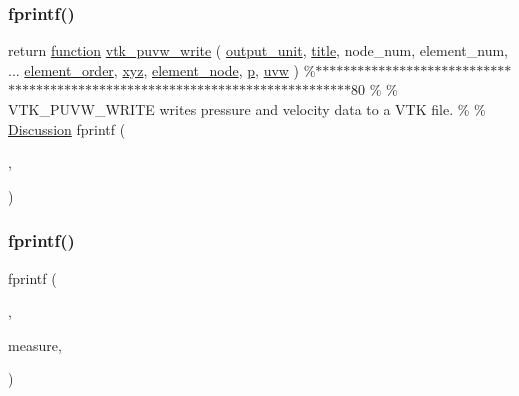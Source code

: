 \subsubsection{\texorpdfstring{fprintf()}{fprintf()}\hspace{0.1cm}{\footnotesize\ttfamily [4/19]}}
{\footnotesize\ttfamily return \hyperlink{a00611_a2420833d971716e9bab41cc9fb3abba1}{function} \hyperlink{a00611_a820b061ee96c178a7c94b48c0189d2ef}{vtk\+\_\+puvw\+\_\+write} ( \hyperlink{a00614_a21b113ecd24e6ae8a92fa4a149ad8701}{output\+\_\+unit}, \hyperlink{a00617_a051e403214cb6872ad3fe4e50302a6ee}{title}, node\+\_\+num, element\+\_\+num, ... \hyperlink{a00611_aa77ee84ffb15118601acbd018f243edc}{element\+\_\+order}, \hyperlink{a00614_a6444a221e6b74abaf6d67d44af2650a0}{xyz}, \hyperlink{a00614_a50df015479692caa32ea5ed86939881e}{element\+\_\+node}, \hyperlink{a00614_a1e0420801cd5156c14e085b87a4945f5}{p}, \hyperlink{a00614_ac062c50cc1b43901b7ea410ae1ff3be9}{uvw} ) \%$\ast$$\ast$$\ast$$\ast$$\ast$$\ast$$\ast$$\ast$$\ast$$\ast$$\ast$$\ast$$\ast$$\ast$$\ast$$\ast$$\ast$$\ast$$\ast$$\ast$$\ast$$\ast$$\ast$$\ast$$\ast$$\ast$$\ast$$\ast$$\ast$$\ast$$\ast$$\ast$$\ast$$\ast$$\ast$$\ast$$\ast$$\ast$$\ast$$\ast$$\ast$$\ast$$\ast$$\ast$$\ast$$\ast$$\ast$$\ast$$\ast$$\ast$$\ast$$\ast$$\ast$$\ast$$\ast$$\ast$$\ast$$\ast$$\ast$$\ast$$\ast$$\ast$$\ast$$\ast$$\ast$$\ast$$\ast$$\ast$$\ast$$\ast$$\ast$$\ast$$\ast$$\ast$$\ast$$\ast$$\ast$80 \% \% V\+T\+K\+\_\+\+P\+U\+V\+W\+\_\+\+W\+R\+I\+TE writes pressure and velocity data to a V\+TK file. \% \% \hyperlink{a00611_afb022d1087d237270af4fbdcc4cce30e}{Discussion} fprintf (\begin{DoxyParamCaption}\item[{1}]{,  }\item[{\textquotesingle{}V\+T\+K\+\_\+\+P\+U\+V\+W\+\_\+\+W\+R\+I\+TE -\/ \hyperlink{a00623_a781a04ab095280f838ff3eb0e51312e0}{Note\+:\textbackslash{}n}\textquotesingle{}}]{ }\end{DoxyParamCaption})}

\mbox{\label{a00611_afdbca82e8254187eadd7c66d61051c3c}} 
\subsubsection{\texorpdfstring{fprintf()}{fprintf()}\hspace{0.1cm}{\footnotesize\ttfamily [5/19]}}
{\footnotesize\ttfamily fprintf (\begin{DoxyParamCaption}\item[{1}]{,  }\item[{\textquotesingle{} As a temporary}]{measure,  }\item[{we are handling quadratic \hyperlink{a00623_a781a04ab095280f838ff3eb0e51312e0}{tets\textbackslash{}n}\textquotesingle{}}]{ }\end{DoxyParamCaption})}

